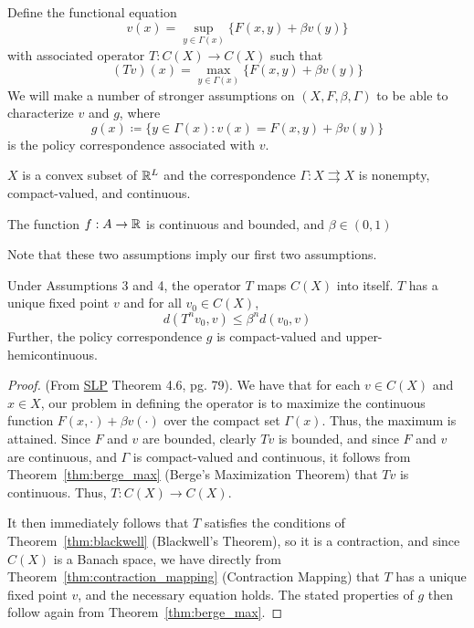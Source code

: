 \documentclass[10pt]{article}
\begin{document}
\begin{model}
	 Define the functional equation
	\[
	v(x) = \sup_{y \in \Gamma(x)} \{F(x,y) + \beta v(y)\}
	\]
	with associated operator $T : C(X) \to C(X)$ such that
	\[
	(Tv)(x) = \max_{y \in \Gamma(x)} \{F(x,y) + \beta v(y)\}
	\]
	We will make a number of stronger assumptions on $(X,F,\beta,\Gamma)$ to be able to characterize $v$ and $g$, where
	\[
	g(x) \coloneqq \{y \in \Gamma(x) : v(x) = F(x,y) + \beta v(y)\}
	\]
	is the policy correspondence associated with $v$.
\end{model}

\begin{assumption}
	$X$ is a convex subset of $\mathbb{R}^L$ and the correspondence $\Gamma: X \rightrightarrows X$ is nonempty, compact-valued, and continuous.
\end{assumption}
\begin{assumption}
	The function $f: A \to \mathbb{R}$ is continuous and bounded, and $\beta \in (0,1)$
\end{assumption}
\begin{remark}
	Note that these two assumptions imply our first two assumptions.
\end{remark}
\begin{theorem}\label{thm:uniqueness_solution} 
	Under Assumptions 3 and 4, the operator $T$ maps $C(X)$ into itself. $T$ has a unique fixed point $v$ and for all $v_0 \in C(X)$, 
	\[
	d(T^n v_0,v) \le \beta^n d(v_0,v)
	\]
	Further, the policy correspondence $g$ is compact-valued and upper-hemicontinuous.
\end{theorem}
\begin{proof}
	(From \href{https://www.hup.harvard.edu/books/9780674750968}{SLP} Theorem 4.6, pg. 79). We have that for each $v \in C(X)$ and $x \in X$, our problem in defining the operator is to maximize the continuous function $F(x,\cdot) + \beta v(\cdot)$ over the compact set $\Gamma(x)$. Thus, the maximum is attained. Since $F$ and $v$ are bounded, clearly $Tv$ is bounded, and since $F$ and $v$ are continuous, and $\Gamma$ is compact-valued and continuous, it follows from Theorem~\ref{thm:berge_max} (Berge's Maximization Theorem) that $Tv$ is continuous. Thus, $T: C(X) \to C(X)$.
	
	It then immediately follows that $T$ satisfies the conditions of Theorem~\ref{thm:blackwell} (Blackwell's Theorem), so it is a contraction, and since $C(X)$ is a Banach space, we have directly from Theorem~\ref{thm:contraction_mapping} (Contraction Mapping) that $T$ has a unique fixed point $v$, and the necessary equation holds. The stated properties of $g$ then follow again from Theorem~\ref{thm:berge_max}.
\end{proof}
\end{document}
